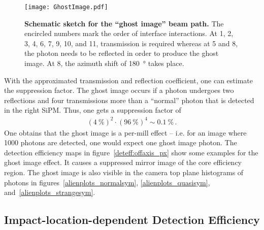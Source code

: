 \begin{figure}[H]
	\centering
	\texttt{[image: GhostImage.pdf]}
	\caption[Schematic sketch for the \enquote{ghost image} beam path]{\textbf{Schematic sketch for the \enquote{ghost image} beam path.} The encircled numbers mark the order of interface interactions. At 1, 2, 3, 4, 6, 7, 9, 10, and 11, transmission is required whereas at 5 and 8, the photon needs to be reflected in order to produce the ghost image. At 8, the azimuth shift of \SI{180}{\degree} takes place.}
	\label{ghostimage_path}
\end{figure}

With the approximated transmission and reflection coefficient, one can estimate the suppression factor. The ghost image occurs if a photon undergoes two reflections and four transmissions more than a \enquote{normal} photon that is detected in the right SiPM. Thus, one gets a suppression factor of
\begin{align}
	(\SI{4}{\percent})^2 \cdot (\SI{96}{\percent})^4 \sim \SI{0.1}{\percent}\,.
\end{align}
One obtains that the ghost image is a per-mill effect -- i.e. for an image where \num{1000} photons are detected, one would expect one ghost image photon. The detection efficiency maps in figure~\ref{deteff:offaxis_px} show some examples for the ghost image effect. It causes a suppressed mirror image of the core efficiency region. The ghost image is also visible in the camera top plane histograms of photons in figures~\ref{alienplots_normalsym}, \ref{alienplots_quasisym}, and~\ref{alienplots_strangesym}.\\
\newpage

\subsection{Impact-location-dependent Detection Efficiency}\label{sec:impactlocation}

